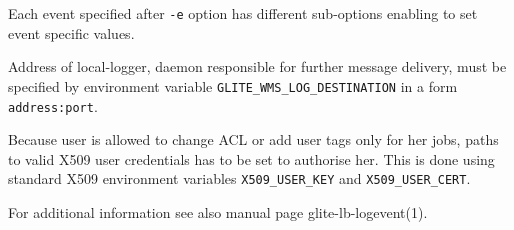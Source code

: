 
Each event specified after \verb'-e' option has different sub-options enabling
to set event specific values.

Address of local-logger, daemon responsible for further message delivery, must 
be specified by environment
variable \verb'GLITE_WMS_LOG_DESTINATION' in a form \verb'address:port'.

Because user is allowed to change ACL or add user tags only for her jobs, paths
to valid X509 user credentials has to be set to authorise her. This is done
using standard X509 environment variables \verb'X509_USER_KEY' and
\verb'X509_USER_CERT'.

For additional information see also manual page glite-lb-logevent(1).




